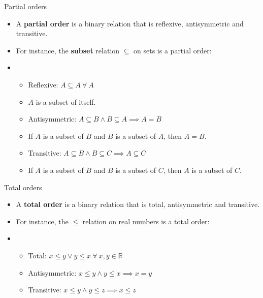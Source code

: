 \documentclass[10pt]{beamer}
\begin{document}
\begin{frame}
	{Partial orders}
	\begin{itemize}
		\item A \textbf{partial order} is a binary relation that is reflexive, antisymmetric and transitive.
		\item For instance, the \textbf{subset} relation $\subseteq$ on sets is a partial order:
		\item[] \begin{itemize}
			      \item[\checkmark] Reflexive:
			            $A \subseteq A\ \forall\ A$
			      \item[] $A$ is a subset of itself.
			      \item[\checkmark] Antisymmetric:
			            $A \subseteq B \land B \subseteq A \implies A = B$
			      \item[] If $A$ is a subset of $B$ and $B$ is a subset of $A$, then $A = B$.
			      \item[\checkmark] Transitive:
			            $A \subseteq B \land B \subseteq C \implies A \subseteq C$
			      \item[] If $A$ is a subset of $B$ and $B$ is a subset of $C$, then $A$ is a subset of $C$.
		      \end{itemize}
	\end{itemize}
\end{frame}

\begin{frame}
	{Total orders}
	\begin{itemize}
		\item A \textbf{total order} is a binary relation that is total, antisymmetric and transitive.
		\item For instance, the $\leq$ relation on real numbers is a total order:
		\item[] \begin{itemize}
			      \item[\checkmark]
			            Total:
			            $x \leq y \lor y \leq x\ \forall\ x, y \in \mathbb{R}$
			      \item[\checkmark]
			            Antisymmetric:
			            $x \leq y \land y \leq x \implies x = y$
			      \item[\checkmark]
			            Transitive:
			            $x \leq y \land y \leq z \implies x \leq z$
		      \end{itemize}
	\end{itemize}
\end{frame}
\end{document}
